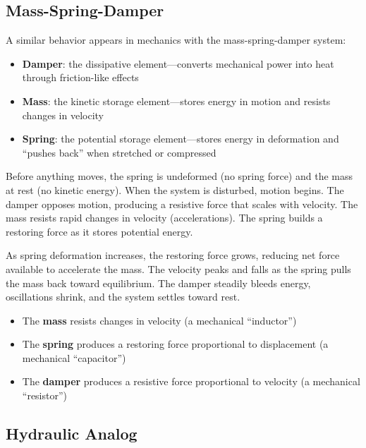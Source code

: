 \documentclass[
  letterpaper,
  DIV=11,
  numbers=noendperiod]{scrartcl}
\providecommand{\tightlist}{%
  \setlength{\itemsep}{0pt}\setlength{\parskip}{0pt}}
\begin{document}
\subsection{Mass-Spring-Damper}\label{mass-spring-damper}

A similar behavior appears in mechanics with the mass-spring-damper
system:

\begin{itemize}
\tightlist
\item
  \textbf{Damper}: the dissipative element---converts mechanical power
  into heat through friction-like effects
\item
  \textbf{Mass}: the kinetic storage element---stores energy in motion
  and resists changes in velocity
\item
  \textbf{Spring}: the potential storage element---stores energy in
  deformation and ``pushes back'' when stretched or compressed
\end{itemize}

Before anything moves, the spring is undeformed (no spring force) and
the mass at rest (no kinetic energy). When the system is disturbed,
motion begins. The damper opposes motion, producing a resistive force
that scales with velocity. The mass resists rapid changes in velocity
(accelerations). The spring builds a restoring force as it stores
potential energy.

As spring deformation increases, the restoring force grows, reducing net
force available to accelerate the mass. The velocity peaks and falls as
the spring pulls the mass back toward equilibrium. The damper steadily
bleeds energy, oscillations shrink, and the system settles toward rest.

\begin{itemize}
\tightlist
\item
  The \textbf{mass} resists changes in velocity (a mechanical
  ``inductor'')
\item
  The \textbf{spring} produces a restoring force proportional to
  displacement (a mechanical ``capacitor'')
\item
  The \textbf{damper} produces a resistive force proportional to
  velocity (a mechanical ``resistor'')
\end{itemize}

\subsection{Hydraulic Analog}\label{hydraulic-analog}
\end{document}
